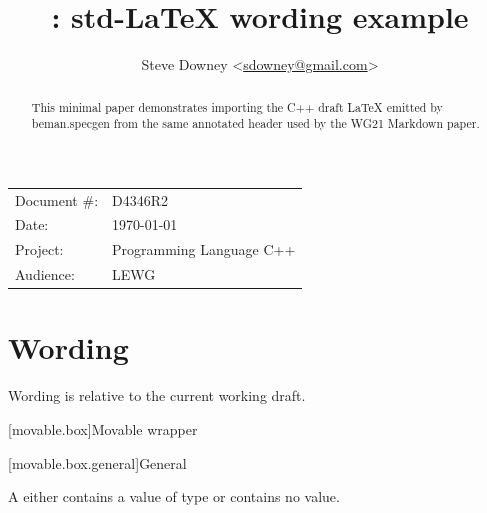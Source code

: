 \documentclass[a4paper,10pt,oneside,openany,final,article]{memoir}
\begin{document}
\title{: std-LaTeX wording example}
\author{Steve Downey \small<\href{mailto:sdowney@gmail.com}{sdowney@gmail.com}>}
\date{}
\maketitle

\begin{flushright}
  \begin{tabular}{ll}
    Document \#: & D4346R2 \\
    Date: & \today \\
    Project: & Programming Language C++ \\
    Audience: & LEWG
  \end{tabular}
\end{flushright}

\begin{abstract}
This minimal paper demonstrates importing the C++ draft LaTeX emitted by
beman.specgen from the same annotated header used by the WG21 Markdown paper.
\end{abstract}

\chapter{Wording}

Wording is relative to the current working draft.

\begin{wording}

[movable.box]{Movable wrapper}

[movable.box.general]{General}

\pnum
A  either contains a value of type  or
contains no value.



\end{wording}
\end{document}
